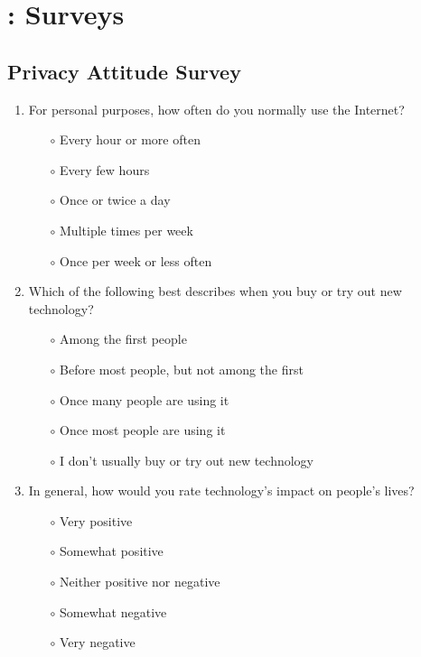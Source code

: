 \chapter{\frameworkAinur: Surveys}
\label{app:ainur-survey}

\section{Privacy Attitude Survey}
\label{appsec:privacy-attitude-survey}


\begin{enumerate}

\item For personal purposes, how often do you normally use the Internet?

\begin{itemize}
\item[$\circ$] Every hour or more often
\item[$\circ$] Every few hours
\item[$\circ$] Once or twice a day
\item[$\circ$] Multiple times per week
\item[$\circ$] Once per week or less often
\end{itemize}

\item Which of the following best describes when you buy or try out new technology?

\begin{itemize}
\item[$\circ$] Among the first people
\item[$\circ$] Before most people, but not among the first
\item[$\circ$] Once many people are using it
\item[$\circ$] Once most people are using it
\item[$\circ$] I don't usually buy or try out new technology
\end{itemize}

\item In general, how would you rate technology's impact on people's lives?

\begin{itemize}
\item[$\circ$] Very positive
\item[$\circ$] Somewhat positive
\item[$\circ$] Neither positive nor negative
\item[$\circ$] Somewhat negative
\item[$\circ$] Very negative
\end{itemize}


\end{enumerate}
